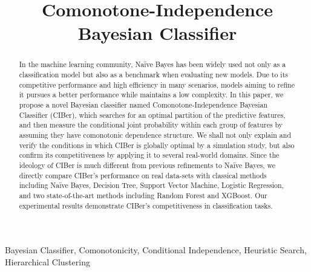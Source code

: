\documentclass[twoside,11pt]{article}
\begin{document}
\title{Comonotone-Independence Bayesian Classifier}
\author{}
\editor{}



\maketitle

\begin{abstract}
    In the machine learning community, Na\"ive Bayes has been widely used not only as a classification model but also as a benchmark when evaluating new models. Due to its competitive performance and high efficiency in many scenarios, models aiming to refine it pursues a better performance while maintains a low complexity. In this paper, we propose a novel Bayesian classifier named Comonotone-Independence Bayesian Classifier (CIBer), which searches for an optimal partition of the predictive features, and then measure the conditional joint probability within each group of features by assuming they have comonotonic dependence structure. We shall not only explain and verify the conditions in which CIBer is globally optimal by a simulation study, but also confirm its competitiveness by applying it to several real-world domains. Since the ideology of CIBer is much different from previous refinements to Na\"ive Bayes, we directly compare CIBer's performance on real data-sets with classical methods including Na\"ive Bayes, Decision Tree, Support Vector Machine, Logistic Regression, and two state-of-the-art methods including Random Forest and XGBoost. Our experimental results demonstrate CIBer's competitiveness in classification tasks.
\end{abstract}

\begin{keywords}
  Bayesian Classifier, Comonotonicity, Conditional Independence, Heuristic Search, Hierarchical Clustering
\end{keywords}
\end{document}
